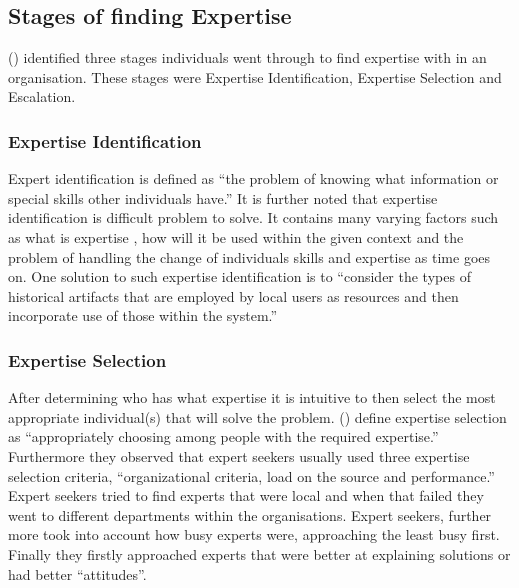 \documentclass[a4paper,oneside,11pt]{report}
\begin{document}
\subsection{Stages of finding Expertise}	
\citeauthor{mcdonalackerman1998}(\citeyear{mcdonalackerman1998}) identified three stages individuals went through to find expertise with in an organisation. These stages were Expertise Identification, Expertise Selection and Escalation.  
\subsubsection{Expertise Identification} 
Expert identification is defined as \enquote {the problem of knowing what information or special skills other individuals have.} It is further noted that expertise identification is difficult problem to solve. It contains many varying factors such as what is expertise , how will it be used within the given context and the problem of handling the change of individuals skills and expertise as time goes on. One solution to such expertise identification is to \enquote {consider the types of historical artifacts that are employed by local users as resources and then incorporate use of those within the system.}\autocite{mcdonalackerman1998}
\subsubsection{Expertise Selection} 
After determining who has what expertise it is intuitive to then select the most appropriate individual(s) that will solve the problem. \citeauthor{mcdonalackerman1998}(\citeyear{mcdonalackerman1998}) define expertise selection as \enquote {appropriately choosing among people with the required expertise.} Furthermore they observed that expert seekers usually used three expertise selection criteria, \enquote {organizational criteria, load on the source and performance.} Expert seekers tried to find experts that were local and when that failed they went to different departments within the organisations. Expert seekers, further more took into account how busy experts were, approaching the least busy first. Finally they firstly approached experts that were better at explaining solutions or had better \enquote {attitudes}.
\end{document}
